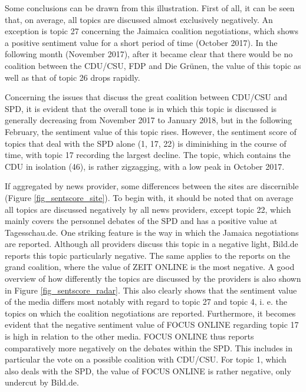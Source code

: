 \documentclass[12pt,a4paper,notitlepage]{article}
\begin{document}
Some conclusions can be drawn from this illustration. First of all, it can be seen that, on average, all topics are discussed almost exclusively negatively. An exception is topic 27 concerning the Jaimaica coalition negotiations, which shows a positive sentiment value for a short period of time (October 2017). In the following month (November 2017), after it became clear that there would be no coalition between the CDU/CSU, FDP and Die Grünen, the value of this topic as well as that of topic 26 drops rapidly. 

Concerning the issues that discuss the great coalition between CDU/CSU and SPD, it is evident that the overall tone is in which this topic is discussed is generally decreasing from November 2017 to January 2018, but in the following February, the sentiment value of this topic rises. However, the sentiment score of topics that deal with the SPD alone (1, 17, 22) is diminishing in the course of time, with topic 17 recording the largest decline. The topic, which contains the CDU in isolation (46), is rather zigzagging, with a low peak in October 2017.

If aggregated by news provider, some differences between the sites are discernible (Figure \ref{fig_sentscore_site}). To begin with, it should be noted that on average all topics are discussed negatively by all news providers, except topic 22, which mainly covers the personnel debates of the SPD and has a positive value at Tagesschau.de. One striking feature is the way in which the Jamaica negotiations are reported. Although all providers discuss this topic in a negative light, Bild.de reports this topic particularly negative. The same applies to the reports on the grand coalition, where the value of ZEIT ONLINE is the most negative. A good overview of how differently the topics are discussed by the providers is also shown in Figure \ref{fig_sentscore_radar}. This also clearly shows that the sentiment value of the media differs most notably with regard to topic 27 and topic 4, i. e. the topics on which the coalition negotiations are reported. Furthermore, it becomes evident that the negative sentiment value of FOCUS ONLINE regarding topic 17 is high in relation to the other media. FOCUS ONLINE thus reports comparatively more negatively on the debates within the SPD. This includes in particular the vote on a possible coalition with CDU/CSU. For topic 1, which also deals with the SPD, the value of FOCUS ONLINE is rather negative, only undercut by Bild.de.
\end{document}
